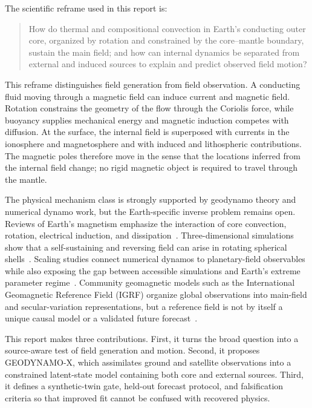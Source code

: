 \documentclass[conference]{IEEEtran}
\begin{document}
The scientific reframe used in this report is:

\begin{quote}
How do thermal and compositional convection in Earth's conducting outer core, organized by rotation and constrained by the core--mantle boundary, sustain the main field; and how can internal dynamics be separated from external and induced sources to explain and predict observed field motion?
\end{quote}

This reframe distinguishes field generation from field observation. A conducting fluid moving through a magnetic field can induce current and magnetic field. Rotation constrains the geometry of the flow through the Coriolis force, while buoyancy supplies mechanical energy and magnetic induction competes with diffusion. At the surface, the internal field is superposed with currents in the ionosphere and magnetosphere and with induced and lithospheric contributions. The magnetic poles therefore move in the sense that the locations inferred from the internal field change; no rigid magnetic object is required to travel through the mantle.

The physical mechanism class is strongly supported by geodynamo theory and numerical dynamo work, but the Earth-specific inverse problem remains open. Reviews of Earth's magnetism emphasize the interaction of core convection, rotation, electrical induction, and dissipation~\cite{robertsking,buffett}. Three-dimensional simulations show that a self-sustaining and reversing field can arise in rotating spherical shells~\cite{glatzmaier}. Scaling studies connect numerical dynamos to planetary-field observables while also exposing the gap between accessible simulations and Earth's extreme parameter regime~\cite{christensen}. Community geomagnetic models such as the International Geomagnetic Reference Field (IGRF) organize global observations into main-field and secular-variation representations, but a reference field is not by itself a unique causal model or a validated future forecast~\cite{alken}.

This report makes three contributions. First, it turns the broad question into a source-aware test of field generation and motion. Second, it proposes GEODYNAMO-X, which assimilates ground and satellite observations into a constrained latent-state model containing both core and external sources. Third, it defines a synthetic-twin gate, held-out forecast protocol, and falsification criteria so that improved fit cannot be confused with recovered physics.
\end{document}
